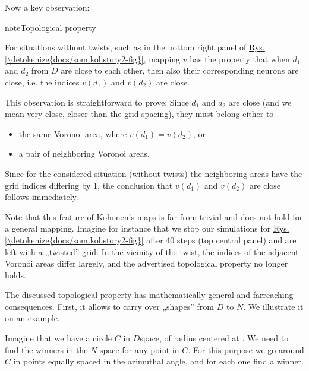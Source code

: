 \documentclass[a4paper,12pt,polish]{jupyterBook}
\begin{document}
\sphinxAtStartPar
Now a key observation:

\begin{sphinxadmonition}{note}{Topological property}

\sphinxAtStartPar
For situations without twists, such as in the bottom right panel of \hyperref[\detokenize{docs/som:kohstory2-fig}]{Rys.\@ \ref{\detokenize{docs/som:kohstory2-fig}}}, mapping \(v\) has the property that when \(d_1\) and \(d_2\) from \(D\) are close to each other, then also their corresponding neurons are close, i.e. the indices \(v(d_1)\) and \(v(d_2)\) are close.
\end{sphinxadmonition}

\sphinxAtStartPar
This observation is straightforward to prove: Since \(d_1\) and \(d_2\) are close (and we mean very close, closer than the grid spacing), they must belong either to
\begin{itemize}
\item {} 
\sphinxAtStartPar
the same Voronoi area, where \(v(d_1)=v(d_2)\), or

\item {} 
\sphinxAtStartPar
a pair of neighboring Voronoi areas.

\end{itemize}

\sphinxAtStartPar
Since for the considered situation (without twists) the neighboring areas have the grid indices differing by 1, the conclusion that \(v(d_1)\) and \(v(d_2)\) are close follows immediately.

\sphinxAtStartPar
Note that this feature of Kohonen’s maps is far from trivial and does not hold for a general mapping. Imagine for instance that we stop our simulations for \hyperref[\detokenize{docs/som:kohstory2-fig}]{Rys.\@ \ref{\detokenize{docs/som:kohstory2-fig}}} after 40 steps (top central panel) and are left with a „twisted” grid. In the vicinity of the twist, the indices of the adjacent Voronoi areas differ largely, and the advertised topological property no longer holds.

\sphinxAtStartPar
The discussed topological property has mathematically general and far\sphinxhyphen{}reaching consequences. First, it allows to carry over „shapes” from \(D\) to \(N\). We illustrate it on an example.

\sphinxAtStartPar
Imagine that we have a circle \(C\) in \(D\)\sphinxhyphen{}space, of radius  centered at . We need to find the winners in the \(N\) space for any point in \(C\). For this purpose we go around \(C\) in  points equally spaced in the azimuthal angle, and for each one find a winner.
\end{document}

